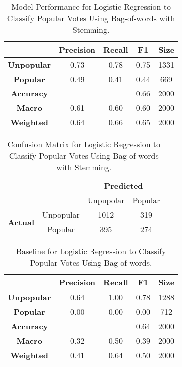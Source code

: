 \documentclass[11pt,a4paper]{article}
\begin{document}
\begin{table}[h!]
\centering
 \begin{tabular}{|c c c c c|} 
 \hline
 & {\bf Precision} & {\bf Recall} & {\bf F1} & {\bf Size} \\ [0.5ex] 
 \hline\hline
 {\bf Unpopular } & 0.73 & 0.78 & 0.75 & 1331\\ 
 {\bf Popular } & 0.49 & 0.41 & 0.44 & 669 \\
 {\bf Accuracy } & & & 0.66 & 2000 \\
 {\bf Macro } & 0.61 & 0.60 & 0.60 & 2000 \\
 {\bf Weighted } & 0.64 & 0.66 & 0.65 & 2000\\ [1ex] 
 \hline
 \end{tabular}
\caption{\label{tab:Table 5}Model Performance for Logistic Regression to Classify Popular Votes Using Bag-of-words with Stemming.}
\end{table}

\begin{table}
\begin{tabular}{cc|cc}
\multicolumn{2}{c}{}
    & \multicolumn{2}{c}{\bf Predicted} \\
    & & Unpupolar & Popular \\ 
    \cline{2-4}
\multirow{2}{*}{{\bf Actual}}
    & Unpopular   & 1012 & 319 \\
    & Popular    & 395 & 274 \\ 
    \cline{2-4}
\end{tabular}
\caption{\label{tab:Table 6}Confusion Matrix for Logistic Regression to Classify Popular Votes Using Bag-of-words with Stemming.}
\end{table}

\begin{table}[h!]
\centering
 \begin{tabular}{|c c c c c|} 
 \hline
 & {\bf Precision} & {\bf Recall} & {\bf F1} & {\bf Size} \\ [0.5ex] 
 \hline\hline
 {\bf Unpopular } & 0.64 & 1.00 & 0.78 & 1288\\ 
 {\bf Popular } & 0.00 & 0.00 & 0.00 & 712 \\
 {\bf Accuracy } & & & 0.64 & 2000 \\
 {\bf Macro } & 0.32 & 0.50 & 0.39 & 2000 \\
 {\bf Weighted } & 0.41 & 0.64 & 0.50 & 2000\\ [1ex] 
 \hline
 \end{tabular}
 \caption{\label{tab:Table 7}Baseline for Logistic Regression to Classify Popular Votes Using Bag-of-words.}
\end{table}
\end{document}
